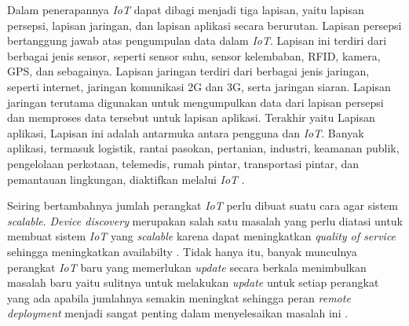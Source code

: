 Dalam penerapannya \textit{IoT} dapat dibagi menjadi tiga lapisan, yaitu lapisan persepsi, lapisan jaringan, dan lapisan aplikasi secara berurutan. Lapisan persepsi bertanggung jawab atas pengumpulan data dalam \textit{IoT}. Lapisan ini terdiri dari berbagai jenis sensor, seperti sensor suhu, sensor kelembaban, RFID, kamera, GPS, dan sebagainya. Lapisan jaringan terdiri dari berbagai jenis jaringan, seperti internet, jaringan komunikasi 2G dan 3G, serta jaringan siaran. Lapisan jaringan terutama digunakan untuk mengumpulkan data dari lapisan persepsi dan memproses data tersebut untuk lapisan aplikasi. Terakhir yaitu Lapisan aplikasi, Lapisan ini adalah antarmuka antara pengguna dan \textit{IoT}. Banyak aplikasi, termasuk logistik, rantai pasokan, pertanian, industri, keamanan publik, pengelolaan perkotaan, telemedis, rumah pintar, transportasi pintar, dan pemantauan lingkungan, diaktifkan melalui \textit{IoT} \parencite{SmartHomeSystemBasedOnIoTTechnologies}.

Seiring bertambahnya jumlah perangkat \textit{IoT} perlu dibuat suatu cara agar sistem \textit{scalable}. \textit{Device discovery} merupakan salah satu masalah yang perlu diatasi untuk membuat sistem \textit{IoT} yang \textit{scalable} karena dapat meningkatkan \textit{quality of service} sehingga meningkatkan availabilty \parencite{DeviceDiscovery}. Tidak hanya itu, banyak munculnya perangkat \textit{IoT} baru yang memerlukan \textit{update} secara berkala menimbulkan masalah baru yaitu sulitnya untuk melakukan \textit{update} untuk setiap perangkat yang ada apabila jumlahnya semakin meningkat sehingga peran \textit{remote deployment} menjadi sangat penting dalam menyelesaikan masalah ini \parencite{RemoteDeployment}.